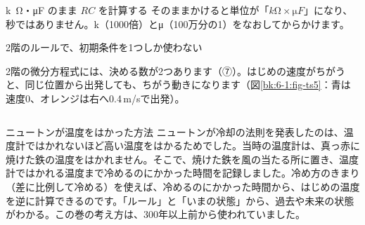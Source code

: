 \begin{tsumazuki}{\unit{k\ohm}・\unit{\micro F} のまま $RC$ を計算する}
そのままかけると単位が「$\unit{k\ohm}\times\unit{\micro F}$」になり、秒ではありません。k（1000倍）とμ（100万分の1）をなおしてからかけます。
\end{tsumazuki}

\begin{tsumazuki}{2階のルールで、初期条件を1つしか使わない}
\noindent\begin{minipage}[c]{0.5\linewidth}
2階の微分方程式には、決める数が2つあります（⑦）。はじめの速度がちがうと、同じ位置から出発しても、ちがう動きになります（図\ref{bk:6-1:fig-ts5}：青は速度0、オレンジは右へ0.4\,m/sで出発）。
\end{minipage}\hfill
\begin{minipage}[c]{0.46\linewidth}\centering
{}
\label{bk:6-1:fig-ts5}
\end{minipage}
\end{tsumazuki}

\begin{column}{ニュートンが温度をはかった方法}
ニュートンが冷却の法則を発表したのは、温度計ではかれないほど高い温度をはかるためでした。当時の温度計は、真っ赤に焼けた鉄の温度をはかれません。そこで、焼けた鉄を風の当たる所に置き、温度計ではかれる温度まで冷めるのにかかった時間を記録しました。冷め方のきまり（差に比例して冷める）を使えば、冷めるのにかかった時間から、はじめの温度を逆に計算できるのです。「ルール」と「いまの状態」から、過去や未来の状態がわかる。この巻の考え方は、300年以上前から使われていました。
\end{column}

